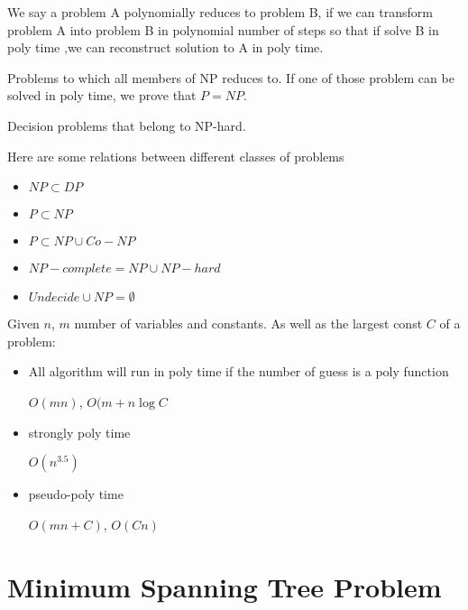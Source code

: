 			\begin{definition}
				We say a problem A polynomially reduces to problem B, if we can transform problem A into problem B in polynomial number of steps so that if solve B in poly time ,we can reconstruct solution to A in poly time.
			\end{definition}

			\begin{definition}[NP-hard]
				Problems to which all members of NP reduces to. If one of those problem can be solved in poly time, we prove that $P=NP$.
			\end{definition}

			\begin{definition}[NPC]
				Decision problems that belong to NP-hard. 
			\end{definition}

			Here are some relations between different classes of problems
			\begin{itemize}
				\item $NP \subset DP$
				\item $P \subset NP$
				\item $P \subset NP \cup Co-NP$
				\item $NP-complete = NP \cup NP-hard$
				\item $Undecide \cup NP = \emptyset$
			\end{itemize}

			Given $n$, $m$ number of variables and constants. As well as the largest const $C$ of a problem:
			\begin{itemize}
				\item All algorithm will run in poly time if the number of guess is a poly function
				\begin{example}
					$O(mn)$, $O(m + n\log C$
				\end{example}
				\item strongly poly time
				\begin{example}
					$O(n^3.5)$
				\end{example}
				\item pseudo-poly time
				\begin{example}
					$O(mn + C)$, $O(Cn)$
				\end{example}
			\end{itemize}

	\chapter{Minimum Spanning Tree Problem}
